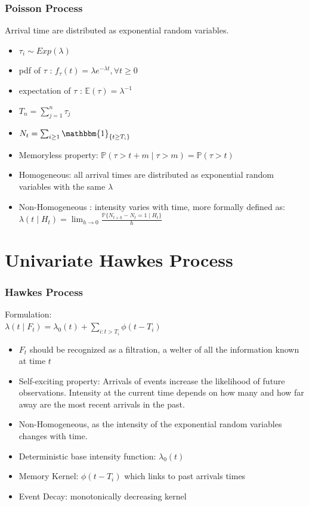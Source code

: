 \documentclass{beamer}
\begin{document}
\begin{frame}
\frametitle{Poisson Process}
Arrival time are distributed as exponential random variables.
\begin{itemize}
	\item $\tau_i \sim Exp(\lambda)$
	\item pdf of $\tau$ : $f_{\tau}(t) = \lambda e^{-\lambda t}, \forall t \ge 0$
	\item expectation of $\tau$ : $\mathbb{E}(\tau) = \lambda^{-1}$
	\item $T_n = \sum_{j=1}^n \tau_j$
	\item $N_t = \sum_{i \ge 1} \mathbbm{1}_{\{ t \ge T_i\}}$
	\item Memoryless property: $\mathbb{P}(\tau > t + m \mid \tau > m) = \mathbb{P}(\tau > t)$
	\item Homogeneous: all arrival times are distributed as exponential random variables with the same $\lambda$
	\item Non-Homogeneous : intensity varies with time, more formally defined as: $\lambda(t \mid H_t) = \lim_{h \to 0} \frac{\mathbb{P}\{ N_{t + h} - N_t = 1 \mid H_t\}}{h}$
\end{itemize}
\end{frame}

\section{Univariate Hawkes Process}

\begin{frame}
\frametitle{Hawkes Process}
Formulation:\\
$\lambda(t \mid F_t) = \lambda_0(t) + \sum_{i: t > T_i} \phi(t - T_i)$
\begin{itemize}
	\item $F_t$ should be recognized as a filtration, a welter of all the information known at time $t$
	\item Self-exciting property: Arrivals of events increase the likelihood of future observations. Intensity at the current time depends on how many and how far away are the most recent arrivals in the past.
	\item Non-Homogeneous, as the intensity of the exponential random variables changes with time.
	\item Deterministic base intensity function: $\lambda_0(t)$
	\item Memory Kernel: $\phi(t - T_i)$ which links to past arrivals times
	\item Event Decay: monotonically decreasing kernel
\end{itemize}
\end{frame}
\end{document}
